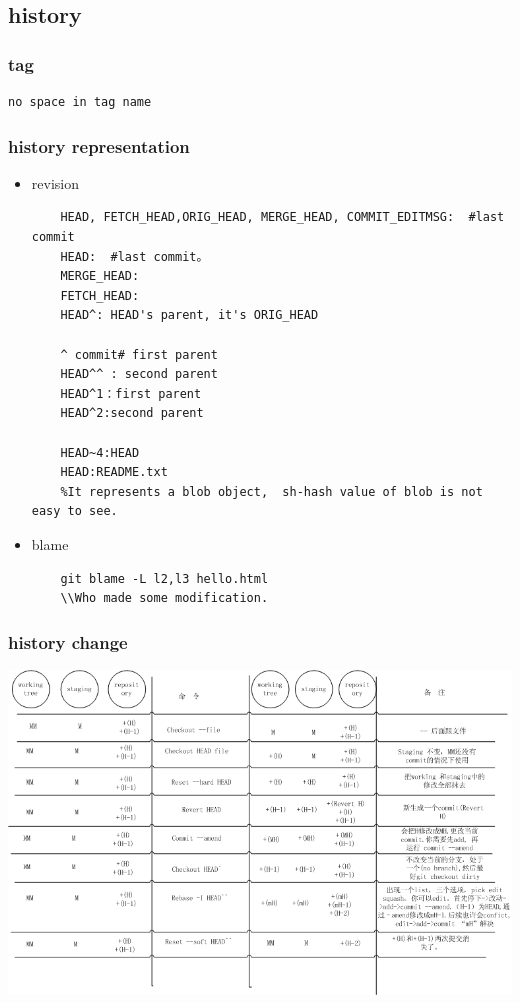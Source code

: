 \documentclass[a4paper,12pt,twoside]{book}
\begin{document}
\subsection{history}

\subsubsection{tag}
\begin{verbatim}
no space in tag name
\end{verbatim}

\subsubsection{history representation}
\begin{itemize}
\item revision \\
    \begin{verbatim}
    HEAD, FETCH_HEAD,ORIG_HEAD, MERGE_HEAD, COMMIT_EDITMSG:  #last commit
    HEAD:  #last commit。
    MERGE_HEAD:
    FETCH_HEAD:
    HEAD^: HEAD's parent, it's ORIG_HEAD

    ^ commit# first parent
    HEAD^^ : second parent
    HEAD^1：first parent
    HEAD^2:second parent

    HEAD~4:HEAD
    HEAD:README.txt
    %It represents a blob object,  sh-hash value of blob is not easy to see.
    \end{verbatim}

\item blame
    \begin{verbatim}
    git blame -L l2,l3 hello.html
    \\Who made some modification.
    \end{verbatim}

\end{itemize}



\subsubsection{history change}
\includegraphics[scale=0.6]{pics/Git-history} \\
\end{document}
